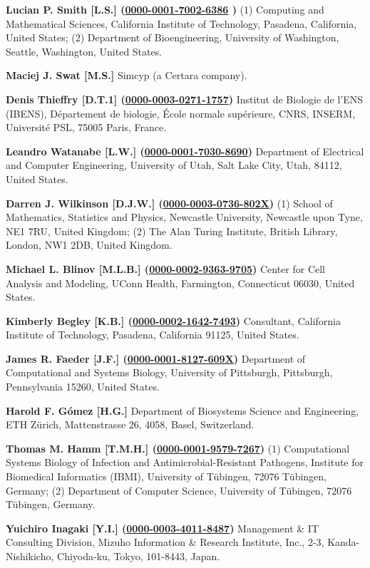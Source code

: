 \documentclass{sbml-paper}
\newcommand{\orcid}[1]{\href{https://orcid.org/#1}{#1}}
\begin{document}
\textbf{Lucian P. Smith [L.S.] (\orcid{0000-0001-7002-6386} )} (1) Computing and Mathematical Sciences, California Institute of Technology, Pasadena, California, United States; (2) Department of Bioengineering, University of Washington, Seattle, Washington, United States.

\textbf{Maciej J. Swat [M.S.]} Simcyp (a Certara company).

\textbf{Denis Thieffry [D.T.1] (\orcid{0000-0003-0271-1757})} Institut de Biologie de l'ENS (IBENS), D\'{e}partement de biologie, \'{E}cole normale sup\'{e}rieure, CNRS, INSERM, Universit\'{e} PSL, 75005 Paris, France.

\textbf{Leandro Watanabe [L.W.] (\orcid{0000-0001-7030-8690})} Department of Electrical and Computer Engineering, University of Utah, Salt Lake City, Utah, 84112, United States.

\textbf{Darren J. Wilkinson [D.J.W.] (\orcid{0000-0003-0736-802X})} (1) School of Mathematics, Statistics and Physics, Newcastle University, Newcastle upon Tyne, NE1 7RU, United Kingdom; (2) The Alan Turing Institute, British Library, London, NW1 2DB, United Kingdom.

\textbf{Michael L. Blinov [M.L.B.] (\orcid{0000-0002-9363-9705})} Center for Cell Analysis and Modeling, UConn Health, Farmington, Connecticut 06030, United States.

\textbf{Kimberly Begley [K.B.] (\orcid{0000-0002-1642-7493})} Consultant, California Institute of Technology, Pasadena, California 91125, United States.

\textbf{James R. Faeder [J.F.] (\orcid{0000-0001-8127-609X})} Department of Computational and Systems Biology, University of Pittsburgh, Pittsburgh, Pennsylvania 15260, United States.

\textbf{Harold F. G\'{o}mez [H.G.]} Department of Biosystems Science and Engineering, ETH Z\"{u}rich, Mattenstrasse 26, 4058, Basel, Switzerland.

\textbf{Thomas M. Hamm [T.M.H.] (\orcid{0000-0001-9579-7267})} (1) Computational Systems Biology of Infection and Antimicrobial-Resistant Pathogens, Institute for Biomedical Informatics (IBMI), University of T\"{u}bingen, 72076 T\"{u}bingen, Germany; (2) Department of Computer Science, University of T\"{u}bingen, 72076 T\"{u}bingen, Germany.

\textbf{Yuichiro Inagaki [Y.I.] (\orcid{0000-0003-4011-8487})} Management \& IT Consulting Division, Mizuho Information \& Research Institute, Inc., 2-3, Kanda-Nishikicho, Chiyoda-ku, Tokyo, 101-8443, Japan.
\end{document}
